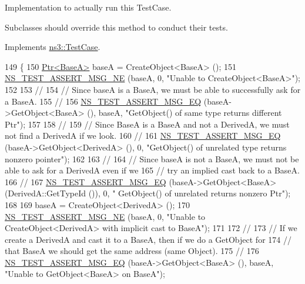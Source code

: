 Implementation to actually run this Test\+Case. 

Subclasses should override this method to conduct their tests. 

Implements \hyperlink{classns3_1_1TestCase_a8ff74680cf017ed42011e4be51917a24}{ns3\+::\+Test\+Case}.


\begin{DoxyCode}
149 \{
150   \hyperlink{classns3_1_1Ptr}{Ptr<BaseA>} baseA = CreateObject<BaseA> ();
151   \hyperlink{group__testing_ga73d66fb0050a5111453fd144e767b91a}{NS\_TEST\_ASSERT\_MSG\_NE} (baseA, 0, \textcolor{stringliteral}{"Unable to CreateObject<BaseA>"});
152 
153   \textcolor{comment}{//}
154   \textcolor{comment}{// Since baseA is a BaseA, we must be able to successfully ask for a BaseA.}
155   \textcolor{comment}{//}
156   \hyperlink{group__testing_ga2a9d78cffb3db8e867c35fff0b698cf5}{NS\_TEST\_ASSERT\_MSG\_EQ} (baseA->GetObject<BaseA> (), baseA, \textcolor{stringliteral}{"GetObject() of same type
       returns different Ptr"});
157 
158   \textcolor{comment}{//}
159   \textcolor{comment}{// Since BaseA is a BaseA and not a DerivedA, we must not find a DerivedA if we look.}
160   \textcolor{comment}{//}
161   \hyperlink{group__testing_ga2a9d78cffb3db8e867c35fff0b698cf5}{NS\_TEST\_ASSERT\_MSG\_EQ} (baseA->GetObject<DerivedA> (), 0, \textcolor{stringliteral}{"GetObject() of unrelated
       type returns nonzero pointer"});
162 
163   \textcolor{comment}{//}
164   \textcolor{comment}{// Since baseA is not a BaseA, we must not be able to ask for a DerivedA even if we}
165   \textcolor{comment}{// try an implied cast back to a BaseA.}
166   \textcolor{comment}{//}
167   \hyperlink{group__testing_ga2a9d78cffb3db8e867c35fff0b698cf5}{NS\_TEST\_ASSERT\_MSG\_EQ} (baseA->GetObject<BaseA> (DerivedA::GetTypeId ()), 0, \textcolor{stringliteral}{"
      GetObject() of unrelated returns nonzero Ptr"});
168 
169   baseA = CreateObject<DerivedA> ();
170   \hyperlink{group__testing_ga73d66fb0050a5111453fd144e767b91a}{NS\_TEST\_ASSERT\_MSG\_NE} (baseA, 0, \textcolor{stringliteral}{"Unable to CreateObject<DerivedA> with implicit
       cast to BaseA"});
171 
172   \textcolor{comment}{//}
173   \textcolor{comment}{// If we create a DerivedA and cast it to a BaseA, then if we do a GetObject for}
174   \textcolor{comment}{// that BaseA we should get the same address (same Object).}
175   \textcolor{comment}{//}
176   \hyperlink{group__testing_ga2a9d78cffb3db8e867c35fff0b698cf5}{NS\_TEST\_ASSERT\_MSG\_EQ} (baseA->GetObject<BaseA> (), baseA, \textcolor{stringliteral}{"Unable to
       GetObject<BaseA> on BaseA"});

\end{DoxyCode}

